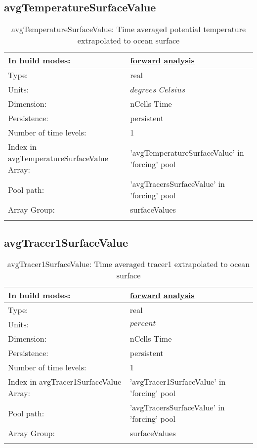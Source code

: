 \subsection[avgTemperatureSurfaceValue]{avgTemperatureSurfaceValue}
\label{subsec:var_sec_forcing_avgTemperatureSurfaceValue}
\begin{center}
\begin{longtable}{| p{2.0in} | p{4.0in} |}
        \hline 
        In build modes: & \hyperref[subsec:forward_var_tab_forcing]{forward} \hyperref[subsec:analysis_var_tab_forcing]{analysis} \\
        \hline 
        Type: & real \\
        \hline 
        Units: & $degrees$ $Celsius$ \\
        \hline 
        Dimension: & nCells Time \\
        \hline 
        Persistence: & persistent \\
        \hline 
        Number of time levels: & 1 \\
        \hline 
		 Index in avgTemperatureSurfaceValue Array: & 'avgTemperatureSurfaceValue' in 'forcing' pool \\
		 \hline 
            Pool path: & 'avgTracersSurfaceValue' in 'forcing' pool
 \\
		 \hline 
		 Array Group: & surfaceValues \\
		 \hline 
    \caption{avgTemperatureSurfaceValue: Time averaged potential temperature extrapolated to ocean surface}
\end{longtable}
\end{center}
\subsection[avgTracer1SurfaceValue]{avgTracer1SurfaceValue}
\label{subsec:var_sec_forcing_avgTracer1SurfaceValue}
\begin{center}
\begin{longtable}{| p{2.0in} | p{4.0in} |}
        \hline 
        In build modes: & \hyperref[subsec:forward_var_tab_forcing]{forward} \hyperref[subsec:analysis_var_tab_forcing]{analysis} \\
        \hline 
        Type: & real \\
        \hline 
        Units: & $percent$ \\
        \hline 
        Dimension: & nCells Time \\
        \hline 
        Persistence: & persistent \\
        \hline 
        Number of time levels: & 1 \\
        \hline 
		 Index in avgTracer1SurfaceValue Array: & 'avgTracer1SurfaceValue' in 'forcing' pool \\
		 \hline 
            Pool path: & 'avgTracersSurfaceValue' in 'forcing' pool
 \\
		 \hline 
		 Array Group: & surfaceValues \\
		 \hline 
    \caption{avgTracer1SurfaceValue: Time averaged tracer1 extrapolated to ocean surface}
\end{longtable}
\end{center}
